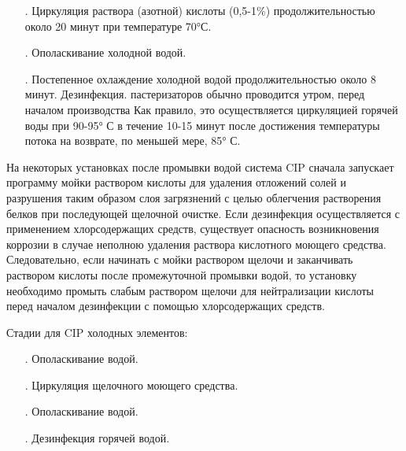 {\begin{itemize}[leftmargin=2.15cm, labelwidth=0.65cm, labelsep=0.0cm]
	\item[\theitemcntr. ] Циркуляция раствора (азотной) кислоты (0,5-1\%) продолжительностью около 20 минут при температуре 70°С.
	\addtocounter{itemcntr}{1}
	
	\item[\theitemcntr. ] Ополаскивание холодной водой.
	\addtocounter{itemcntr}{1}
	
	\item[\theitemcntr. ] Постепенное охлаждение холодной водой продолжительностью около 8 минут. Дезинфекция. пастеризаторов обычно проводится утром, перед началом производства Как правило, это осуществляется циркуляцией горячей воды при 90-95° С в течение 10-15 минут после достижения температуры потока на возврате, по меньшей мере, 85° С.
	\addtocounter{itemcntr}{1}
	
	\setcounter{itemcntr}{1}
\end{itemize}  

\par \redline На некоторых установках после промывки водой система CIP сначала запускает программу мойки раствором кислоты для удаления отложений солей и разрушения таким образом слоя загрязнений с целью облегчения растворения белков при последующей щелочной очистке. Если дезинфекция осуществляется с применением хлорсодержащих средств, существует опасность возникновения коррозии в случае неполною удаления раствора кислотного моющего средства. Следовательно, если начинать с мойки раствором щелочи и заканчивать раствором кислоты после промежуточной промывки водой, то установку необходимо промыть слабым раствором щелочи для нейтрализации кислоты перед началом дезинфекции с помощью хлорсодержащих средств.

\par \redline Стадии для CIP холодных элементов:

\begin{itemize}[leftmargin=2.15cm, labelwidth=0.65cm, labelsep=0.0cm] 
	
	\item[\theitemcntr. ] Ополаскивание водой.
	\addtocounter{itemcntr}{1}
	
	\item[\theitemcntr. ] Циркуляция щелочного моющего средства.
	\addtocounter{itemcntr}{1}
	
	\item[\theitemcntr. ] Ополаскивание водой.
	\addtocounter{itemcntr}{1}
	
	\item[\theitemcntr. ] Дезинфекция горячей водой.
	\addtocounter{itemcntr}{1}
	

\end{itemize}}
